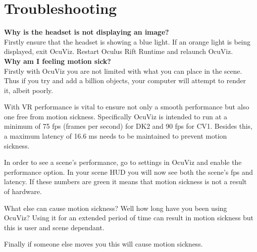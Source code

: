 \documentclass[a4paper,12pt]{article}
\begin{document}
\newpage

\section{Troubleshooting}

\textbf{Why is the headset is not displaying an image?} \\ 
Firstly ensure that the headset is showing a blue light. If an orange light is being displayed, exit OcuViz. Restart Oculus Rift Runtime and relaunch OcuViz.\\

\textbf{Why am I feeling motion sick?} \\
Firstly with OcuViz you are not limited with what you can place in the scene. Thus if you try and add a billion objects, your computer will attempt to render it, albeit poorly.

With VR performance is vital to ensure not only a smooth performance but also one free from motion sickness. Specifically OcuViz is intended to run at a minimum of 75 fps (frames per second) for DK2 and 90 fps for CV1. Besides this, a maximum latency of 16.6 ms needs to be maintained to prevent motion sickness.

In order to see a scene's performance, go to settings in OcuViz and enable the performance option. In your scene HUD you will now see both the scene's fps and latency. If these numbers are green it means that motion sickness is not a result of hardware.

What else can cause motion sickness? Well how long have you been using OcuViz? Using it for an extended period of time can result in motion sickness but this is user and scene dependant. 

Finally if someone else moves you this will cause motion sickness.

%
%
\end{document}

